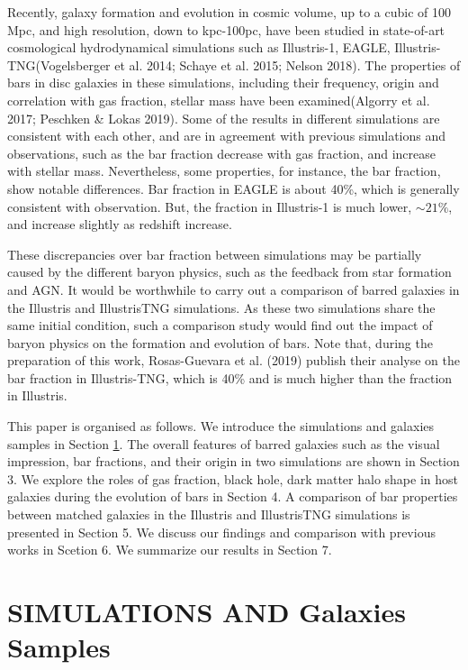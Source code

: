 Recently, galaxy formation and evolution in cosmic volume, up to a cubic of 100 Mpc, and high resolution, down to kpc-100pc, have been studied in state-of-art cosmological hydrodynamical simulations such as Illustris-1, EAGLE, Illustris-TNG(Vogelsberger et al. 2014; Schaye et al. 2015; Nelson 2018). The properties of bars in disc galaxies in these simulations, including their frequency, origin and correlation with gas fraction, stellar mass have been examined(Algorry et al. 2017; Peschken \& Lokas 2019). Some of the results in different simulations are consistent with each other, and are in agreement with previous simulations and observations, such as the bar fraction decrease with gas fraction, and increase with stellar mass. Nevertheless, some properties, for instance, the bar fraction, show notable differences. Bar fraction in EAGLE is about 40\%, which is generally consistent with observation. But, the fraction in Illustris-1 is much lower, $\sim 21\%$, and increase slightly as redshift increase. 

These discrepancies over bar fraction between simulations may be partially caused by the different baryon physics, such as the feedback from star formation and AGN. It would be worthwhile to carry out a comparison of barred galaxies in the Illustris and IllustrisTNG simulations. As these two simulations share the same initial condition, such a comparison study would find out the impact of baryon physics on the formation and evolution of bars. Note that, during the preparation of this work, Rosas-Guevara et al. (2019) publish their analyse on the bar fraction in Illustris-TNG, which is 40\% and is much higher than the fraction in Illustris.

This paper is organised as follows. We introduce the simulations and galaxies samples in Section \ref{sec:samples}. The overall features of barred galaxies such as the visual impression, bar fractions, and their origin in two simulations are shown in Section 3. We explore the roles of gas fraction, black hole, dark matter halo shape in host galaxies during the evolution of bars in Section 4. A comparison of bar properties between matched galaxies in the Illustris and IllustrisTNG simulations is presented in Section 5. We discuss our findings and comparison with previous works in Scetion 6. We summarize our results in Section 7. 

\section{SIMULATIONS AND Galaxies Samples} \label{sec:samples}
